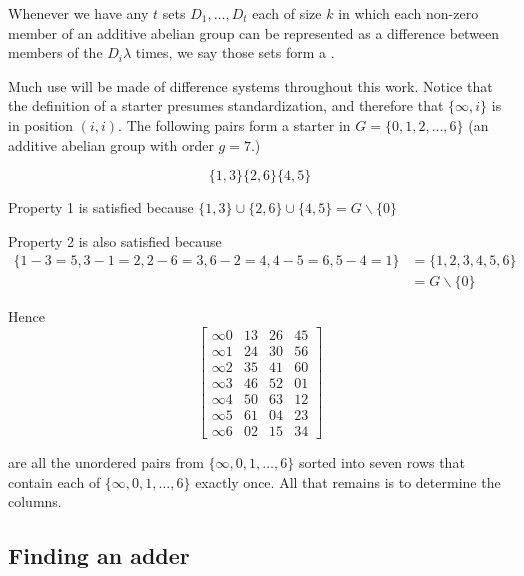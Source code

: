 Whenever we have any $t$ sets $D_1, \ldots, D_t$ each of size $k$ in which each non-zero member of an additive abelian group can be represented as a difference between members of the $D_i \lambda$ times, we say those sets form a .

Much use will be made of difference systems throughout this work.
Notice that the definition of a starter presumes standardization, and therefore that $\{\infty, i\}$ is in position $(i, i)$.
The following pairs form a starter in $G = \{0, 1, 2, \ldots, 6\}$ (an additive abelian group with order $g = 7$.)

\begin{equation}
\{1,3\} \{2,6\} \{4,5\}
\end{equation}

Property 1 is satisfied because
$\{1,3\} \cup \{2,6\} \cup \{4,5\} = G \backslash \{0\}$

Property 2 is also satisfied because
\begin{equation}
\begin{split}
\{1 - 3 = 5, 3 - 1 = 2, 2 - 6 = 3, 6 - 2 = 4, 4 - 5 = 6, 5 - 4 = 1\} &= \{1, 2, 3, 4, 5, 6\} \\
 &= G\backslash \{0\}
\end{split}
\end{equation}

Hence
\begin{equation}
  \begin{bmatrix}
    \infty 0 &  13 &  26 &  45 \\
    \infty 1 &  24 &  30 &  56 \\
    \infty 2 &  35 &  41 &  60 \\
    \infty 3 &  46 &  52 &  01 \\
    \infty 4 &  50 &  63 &  12 \\
    \infty 5 &  61 &  04 &  23 \\
    \infty 6 &  02 &  15 &  34
  \end{bmatrix}
  \label{eq:starter}
\end{equation}

are all the unordered pairs from $\{\infty, 0, 1, \ldots, 6\}$ sorted into seven rows that contain each of $\{\infty, 0, 1, \ldots, 6\}$ exactly once.
All that remains is to determine the columns.

\subsection{Finding an adder}

